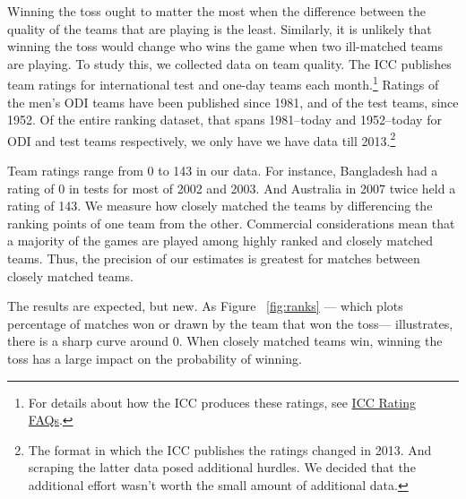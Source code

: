 \documentclass[12pt]{article}
\begin{document}
Winning the toss ought to matter the most when the difference between the quality of the teams that are playing is the least. Similarly, it is unlikely that winning the toss would change who wins the game when two ill-matched teams are playing. To study this, we collected data on team quality. The ICC publishes team ratings for international test and one-day teams each month.\footnote{For details about how the ICC produces these ratings, see \href{http://icc-live.s3.amazonaws.com/cms/media/about_docs/536b1a48c16e5-Reliance\%20ICC\%20ODI\%20Team\%20Rankings\%20FAQs\%202014.pdf}{ICC Rating FAQs}.} Ratings of the men's ODI teams have been published since 1981, and of the test teams, since 1952. Of the entire ranking dataset, that spans 1981--today and 1952--today for ODI and test teams respectively, we only have we have data till 2013.\footnote{The format in which the ICC publishes the ratings changed in 2013. And scraping the latter data posed additional hurdles. We decided that the additional effort wasn't worth the small amount of additional data.} 

Team ratings range from 0 to 143 in our data. For instance, Bangladesh had a rating of 0 in tests for most of 2002 and 2003. And Australia in 2007 twice held a rating of 143. We measure how closely matched the teams by differencing the ranking points of one team from the other. Commercial considerations mean that a majority of the games are played among highly ranked and closely matched teams. Thus, the precision of our estimates is greatest for matches between closely matched teams.

The results are expected, but new. As Figure ~\ref{fig:ranks} --- which plots percentage of matches won or drawn by the team that won the toss--- illustrates, there is a sharp curve around 0. When closely matched teams win, winning the toss has a large impact on the probability of winning. 
\end{document}
